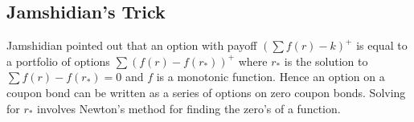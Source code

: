 \documentclass{article}
\theoremstyle{definition}
\begin{document}
  
\subsection{Jamshidian's Trick} \label{Jamshidian}

Jamshidian pointed out that an option with payoff \(\left(\sum f(r) -k\right)^+\) is equal to a portfolio of options \(\sum (f(r)-f(r_*))^+\) where \(r_*\) is the solution to \(\sum f(r)-f(r_*)=0\) and \(f\) is a monotonic function. Hence an option on a coupon bond can be written as a series of options on zero coupon bonds.   Solving for \(r_*\) involves Newton's method for finding the zero's of a function.  
\end{document}
